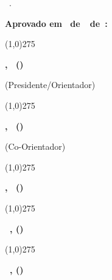 \begin{folhaaprovacao}
	\setlength{\headheight}{15pt}
	\centering
	{\bfseries\autor}\par
	\vspace{84pt}
	\onehalfspacing
	\textsc{\bfseries\tituloTrabalho}\par
	
	\vspace*{\fill} 
	\begin{adjustwidth}{0.5\textwidth}{}
		\justifying
		\singlespacing
		\textoFolhaRosto\ \textbf{\grauFolhaRosto}.\par
	\end{adjustwidth}
	\vspace*{\fill}

	\centering
	\vspace{48pt}
	\textbf{Aprovado em \diaDefesa\ de\ \mesDefesa\ de\ \ano:}\par
	
	\vspace{48pt}
	\linethickness{1.75pt}
	\line(1,0){275}\par
	\textbf{\orientador , \orientadorTitulo\ (\universidadeSigla)}\par
	(Presidente/Orientador)
	
	\vspace{18pt}
	\line(1,0){275}\par
	\textbf{\bancaUm , \bancaUmTitulo\ (\bancaUmSigla)}\par
	\ifcoorientador
		{(Co-Orientador)}
	\fi
	
	\vspace{18pt}
	\line(1,0){275}\par
	\textbf{\bancaDois , \bancaDoisTitulo\ (\bancaDoisSigla)}\par

	\ifbancaTresExiste
	{\vspace{18pt}\line(1,0){275}\par
	\textbf{\bancaTres\ , \bancaTresTitulo (\bancaTresSigla)}\par}
	\else
	\fi
	
	\ifbancaQuatroExiste
	{\vspace{18pt}\line(1,0){275}\par
	\textbf{\bancaQuatro\ , \bancaQuatroTitulo (\bancaQuatroSigla)}\par}
	\else
	\fi
	
	\vfill
	\cidadeCEP\par
	\ano\par
\end{folhaaprovacao}